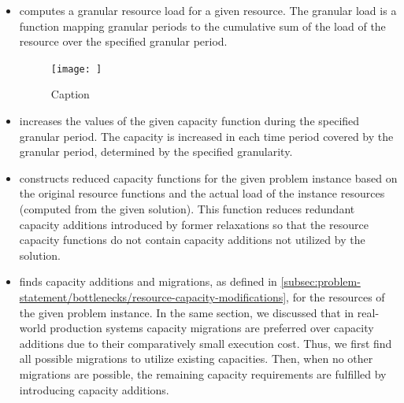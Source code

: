 \begin{itemize}
    \item {}
        computes a granular resource load for a given resource.
        The granular load is a function mapping granular periods to the cumulative sum of the load
        of the resource over the specified granular period.
        \begin{figure}
            \centering
            \texttt{[image: ]}
            \caption{Caption}
            \label{fig:enter-label}
        \end{figure}
        
    \item {}
        increases the values of the given capacity function during the specified granular period.
        The capacity is increased in each time period covered by the granular period,
        determined by the specified granularity.

    \item {}
        constructs reduced capacity functions for the given problem instance based on the original resource functions
        and the actual load of the instance resources (computed from the given solution).
        This function reduces redundant capacity additions introduced by former relaxations
        so that the resource capacity functions do not contain capacity additions not utilized by the solution.

    \item {}
        finds capacity additions and migrations,
        as defined in \cref{subsec:problem-statement/bottlenecks/resource-capacity-modifications},
        for the resources of the given problem instance.
        In the same section,
        we discussed that in real-world production systems
        capacity migrations are preferred over capacity additions due to their comparatively small execution cost.
        Thus, we first find all possible migrations to utilize existing capacities.
        Then, when no other migrations are possible, the remaining capacity requirements are fulfilled
        by introducing capacity additions.
\end{itemize}


